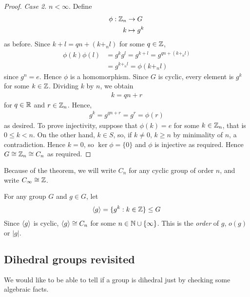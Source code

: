 \documentclass{../../template/note}
\begin{document}
\begin{proof}
        \emph{Case 2.} \(n < \infty\). Define
        \begin{align*}
            \phi: \mathbb Z_n &\to G \\
            k &\mapsto g^k
        \end{align*}
        as before. Since \(k+l = qn + (k +_n l)\) for some \(q \in \mathbb Z\),
        \begin{align*}
            \phi(k)\phi(l) &= g^kg^l = g^{k+l} = g^{qn+(k+_nl)} \\
            &= g^{k+_nl} = \phi(k +_n l)
        \end{align*}
        since \(g^n = e\). Hence \(\phi\) is a homomorphism. Since \(G\) is cyclic, every element is \(g^k\) for some \(k \in \mathbb Z\). Dividing \(k\) by \(n\), we obtain
        \begin{align*}
            k = qn + r
        \end{align*}
        for \(q \in \mathbb R\) and \(r \in \mathbb Z_n\). Hence,
        \begin{align*}
            g^k = g^{qn+r} = g^r = \phi(r)
        \end{align*}
        as desired. To prove injectivity, suppose that \(\phi(k) = e\) for some \(k \in \mathbb Z_n\), that is \(0 \leq k < n\). On the other hand, \(k \in S\), so, if \(k \neq 0\), \(k \geq n\) by minimality of \(n\), a contradiction. Hence \(k=0\), so \(\ker \phi = \{0\}\) and \(\phi\) is injective as required. Hence \(G \cong \mathbb Z_n \cong C_n\) as required.
    \end{proof}
    
    Because of the theorem, we will write \(C_n\) for any cyclic group of order \(n\), and write \(C_\infty \cong \mathbb Z\).

    \begin{definition}
        For any group \(G\) and \(g \in G\), let
        \begin{align*}
            \left \langle g \right \rangle = \{g^k : k \in \mathbb Z\} \leq G
        \end{align*}
        Since \(\left \langle g \right \rangle\) is cyclic, \(\left \langle g \right \rangle \cong C_n\) for some \(n \in \mathbb N \cup \{\infty\}\). This is the \emph{order} of \(g\), \(o(g)\) or \(|g|\).        
    \end{definition}
    
    \subsection{Dihedral groups revisited}

    We would like to be able to tell if a group is dihedral just by checking some algebraic facts.
\end{document}
